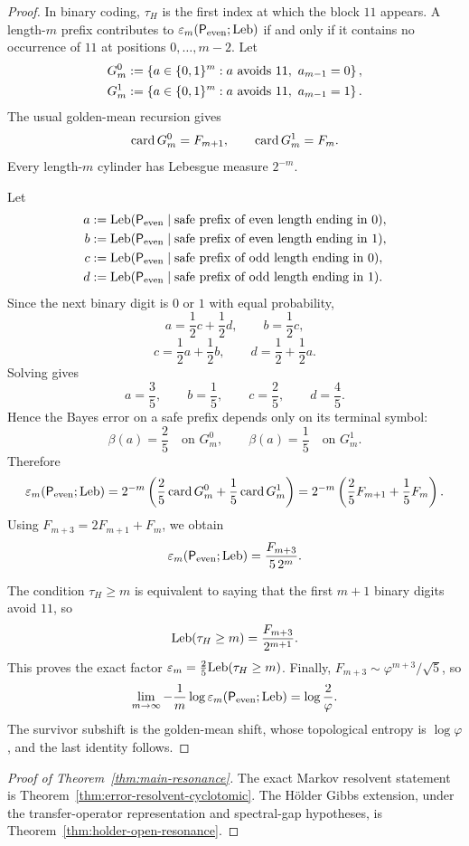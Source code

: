 \begin{proof}
In binary coding, \(\tau_H\) is the first index at which the block
\(11\) appears.  A length-\(m\) prefix contributes to
\(\varepsilon_m(\mathsf{P}_{\mathrm{even}};\mathrm{Leb})\) if and only if it
contains no occurrence of \(11\) at positions \(0,\ldots,m-2\).  Let
\begin{align*}
  G_m^0
  &:= \left\{a\in\{0,1\}^m:
           a \text{ avoids }11,\ a_{m-1}=0\right\}, \\
  G_m^1
  &:= \left\{a\in\{0,1\}^m:
           a \text{ avoids }11,\ a_{m-1}=1\right\}.
\end{align*}
The usual golden-mean recursion gives
\[
  \operatorname{card}{G_m^0}=F_{m+1},
  \qquad
  \operatorname{card}{G_m^1}=F_m.
\]
Every length-\(m\) cylinder has Lebesgue measure \(2^{-m}\).

Let
\begin{align*}
  a
  &:= \mathrm{Leb}(\mathsf{P}_{\mathrm{even}}
           \mid \text{safe prefix of even length ending in }0), \\
  b
  &:= \mathrm{Leb}(\mathsf{P}_{\mathrm{even}}
           \mid \text{safe prefix of even length ending in }1), \\
  c
  &:= \mathrm{Leb}(\mathsf{P}_{\mathrm{even}}
           \mid \text{safe prefix of odd length ending in }0), \\
  d
  &:= \mathrm{Leb}(\mathsf{P}_{\mathrm{even}}
           \mid \text{safe prefix of odd length ending in }1).
\end{align*}
Since the next binary digit is \(0\) or \(1\) with equal probability,
\[
  a=\frac12 c+\frac12 d,
  \qquad
  b=\frac12 c,
\]
\[
  c=\frac12 a+\frac12 b,
  \qquad
  d=\frac12+\frac12 a.
\]
Solving gives
\[
  a=\frac35,\qquad b=\frac15,\qquad c=\frac25,\qquad d=\frac45.
\]
Hence the Bayes error on a safe prefix depends only on its terminal
symbol:
\[
  \beta(a)=\frac25
  \quad\text{on }G_m^0,
  \qquad
  \beta(a)=\frac15
  \quad\text{on }G_m^1.
\]
Therefore
\[
  \varepsilon_m(\mathsf{P}_{\mathrm{even}};\mathrm{Leb})
  = 2^{-m}\left(
      \frac25\operatorname{card}{G_m^0}
      + \frac15\operatorname{card}{G_m^1}
    \right)
  = 2^{-m}\left(
      \frac25F_{m+1}
      + \frac15F_m
    \right).
\]
Using \(F_{m+3}=2F_{m+1}+F_m\), we obtain
\[
  \varepsilon_m(\mathsf{P}_{\mathrm{even}};\mathrm{Leb})
  = \frac{F_{m+3}}{5\,2^m}.
\]

The condition \(\tau_H\geq m\) is equivalent to saying that the first
\(m+1\) binary digits avoid \(11\), so
\[
  \mathrm{Leb}(\tau_H\geq m)=\frac{F_{m+3}}{2^{m+1}}.
\]
This proves the exact factor \(\varepsilon_m=\frac25\mathrm{Leb}(\tau_H\geq m)\).
Finally, \(F_{m+3}\sim \varphi^{m+3}/\sqrt5\), so
\[
  \lim_{m\to\infty}
  -\frac1m\log\varepsilon_m(\mathsf{P}_{\mathrm{even}};\mathrm{Leb})
  = \log\frac{2}{\varphi}.
\]
The survivor subshift is the golden-mean shift, whose topological
entropy is \(\log\varphi\), and the last identity follows.
\end{proof}

\begin{proof}[Proof of Theorem~\ref{thm:main-resonance}]
The exact Markov resolvent statement is
Theorem~\ref{thm:error-resolvent-cyclotomic}.  The H\"older Gibbs
extension, under the transfer-operator representation and spectral-gap
hypotheses, is Theorem~\ref{thm:holder-open-resonance}.
\end{proof}
